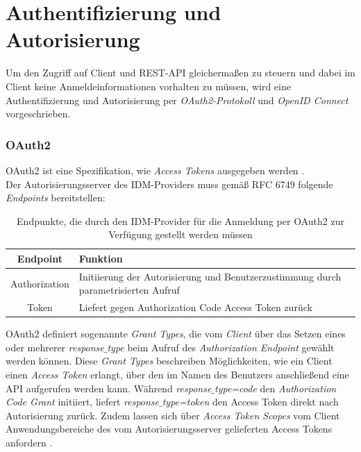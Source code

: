 \chapter{Authentifizierung und Autorisierung}

Um den Zugriff auf Client und REST-API gleichermaßen zu steuern und dabei im Client keine Anmeldeinformationen vorhalten zu müssen, wird eine Authentifizierung und Autorisierung per \textit{OAuth2-Protokoll} und \textit{OpenID Connect} vorgeschrieben.

\subsection{OAuth2}
\label{auth:oauth2}

OAuth2 ist eine Spezifikation, wie \textit{Access Tokens} ausgegeben werden \cite{rfc6749}. \\ 

Der Autorisierungsserver des IDM-Providers muss gemäß RFC 6749 folgende \textit{Endpoints} bereitstellen:

\begin{table}[htb]
    \begin{tabularx}{\textwidth}{|c|X|}
        \hline
\textbf{Endpoint} & \textbf{Funktion} \\ \hline
Authorization & Initiierung der Autorisierung und Benutzerzustimmung durch parametrisierten Aufruf \\ \hline
Token & Liefert gegen Authorization Code Access Token zurück \\ \hline
    \end{tabularx}

        \caption{Endpunkte, die durch den IDM-Provider für die Anmeldung per OAuth2 zur Verfügung gestellt werden müssen}
        \label{tab:auth:endpoints}
\end{table}

OAuth2 definiert sogenannte \textit{Grant Types}, die vom \textit{Client} über das Setzen eines oder mehrerer \textit{response$\_$type} beim Aufruf des \textit{Authorization Endpoint} gewählt werden können. 
Diese \textit{Grant Types} beschreiben Möglichkeiten, wie ein Client einen \textit{Access Token} erlangt, über den im Namen des Benutzers anschließend eine API aufgerufen werden kann. 
Während \textit{response$\_$type=code} den \textit{Authorization Code Grant} initiiert, liefert \textit{response$\_$type=token} den Access Token direkt nach Autorisierung zurück. 
Zudem lassen sich über \textit{Access Token Scopes} vom Client Anwendungsbereiche des vom Autorisierungsserver gelieferten Access Tokens anfordern \cite[Kap.~3.3]{rfc6749}. \\

